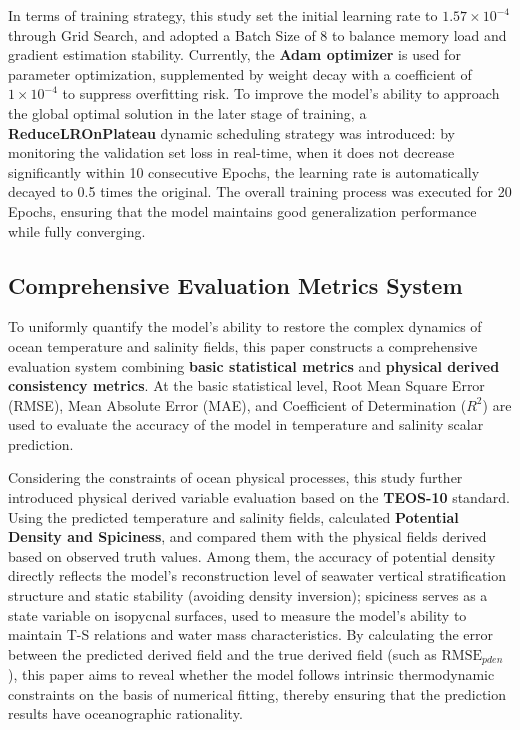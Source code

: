 \documentclass[webpdf,contemporary,large]{oup-authoring-template}
\begin{document}
In terms of training strategy, this study set the initial learning rate to $1.57 \times 10^{-4}$ through Grid Search, and adopted a Batch Size of 8 to balance memory load and gradient estimation stability. Currently, the \textbf{Adam optimizer} is used for parameter optimization, supplemented by weight decay with a coefficient of $1\times 10^{-4}$ to suppress overfitting risk. To improve the model's ability to approach the global optimal solution in the later stage of training, a \textbf{ReduceLROnPlateau} dynamic scheduling strategy was introduced: by monitoring the validation set loss in real-time, when it does not decrease significantly within 10 consecutive Epochs, the learning rate is automatically decayed to 0.5 times the original. The overall training process was executed for 20 Epochs, ensuring that the model maintains good generalization performance while fully converging.

\subsection{Comprehensive Evaluation Metrics System}

To uniformly quantify the model's ability to restore the complex dynamics of ocean temperature and salinity fields, this paper constructs a comprehensive evaluation system combining \textbf{basic statistical metrics} and \textbf{physical derived consistency metrics}. At the basic statistical level, Root Mean Square Error (RMSE), Mean Absolute Error (MAE), and Coefficient of Determination ($R^2$) are used to evaluate the accuracy of the model in temperature and salinity scalar prediction.

Considering the constraints of ocean physical processes, this study further introduced physical derived variable evaluation based on the \textbf{TEOS-10} standard. Using the predicted temperature and salinity fields, calculated \textbf{Potential Density and Spiciness}, and compared them with the physical fields derived based on observed truth values. Among them, the accuracy of potential density directly reflects the model's reconstruction level of seawater vertical stratification structure and static stability (avoiding density inversion); spiciness serves as a state variable on isopycnal surfaces, used to measure the model's ability to maintain T-S relations and water mass characteristics. By calculating the error between the predicted derived field and the true derived field (such as $\text{RMSE}_{pden}$), this paper aims to reveal whether the model follows intrinsic thermodynamic constraints on the basis of numerical fitting, thereby ensuring that the prediction results have oceanographic rationality.
\end{document}
